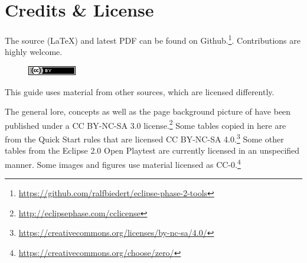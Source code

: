 \section*{Credits \& License}


\begin{itemize}
    \itembox The source (LaTeX) and latest PDF can be found on Github.\footnote{\url{https://github.com/ralfbiedert/eclipse-phase-2-tools}}. Contributions are highly welcome.

     \begin{figure}[H]
         \centering
         \includegraphics{gfx/license}\\
     \end{figure}
\end{itemize}

This guide uses material from other sources, which are licensed differently.

\begin{itemize}
    \itembox The general lore, concepts as well as the page background picture of \eclipsephase have been published under a CC BY-NC-SA 3.0 license.\footnote{\url{http://eclipsephase.com/cclicense}}
    \itembox Some tables copied in here are from the  Quick Start rules that are licensed CC BY-NC-SA 4.0.\footnote{\url{https://creativecommons.org/licenses/by-nc-sa/4.0/}} Some other tables from the Eclipse 2.0 Open Playtest are currently licensed in an unspecified manner.
    \itembox Some images and figures use material licensed as CC-0.\footnote{\url{https://creativecommons.org/choose/zero/}}
\end{itemize}

